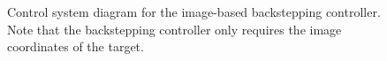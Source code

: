 \begin{figure}[thpb]
	\centering
	\caption{Control system diagram for the image-based backstepping controller. Note that the backstepping controller only requires the image coordinates of the target.}
	\label{system_image}
\end{figure}

